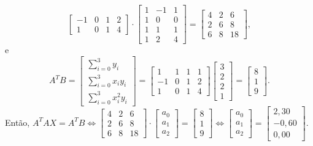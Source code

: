 \documentclass[12pt,a4paper]{article}
\begin{document}
\begin{ExerciseList}
\[\begin{bmatrix}
-1 & 0 & 1 & 2 \\
 1 & 0 & 1 & 4
\end{bmatrix}
\cdot
\begin{bmatrix}
  1 & -1 & 1\\
  1 & 0 & 0\\
  1 & 1 & 1\\
  1 & 2 & 4
\end{bmatrix}
=\begin{bmatrix}
4 & 2 & 6 \\
2 & 6 & 8 \\
6 & 8 & 18
\end{bmatrix},
\]
e
\[
A^T B
= \begin{bmatrix}
 \sum_{i=0}^3 y_i     \\
 \sum_{i=0}^3 x_i y_i \\
 \sum_{i=0}^3 x_i^2 y_i
\end{bmatrix}
= \begin{bmatrix}
 1 & 1 & 1 & 1 \\
-1 & 0 & 1 & 2 \\
 1 & 0 & 1 & 4
\end{bmatrix}
\begin{bmatrix}
3 \\ 2 \\ 2 \\ 1
\end{bmatrix}
= \begin{bmatrix}
8 \\ 1 \\ 9
\end{bmatrix}.
\]
Então,
$
A^T A X = A^T B
\Leftrightarrow
\begin{bmatrix}
4 & 2 & 6 \\
2 & 6 & 8 \\
6 & 8 & 18
\end{bmatrix}
\cdot
\begin{bmatrix}
a_0\\
a_1\\
a_2
\end{bmatrix}
=
\begin{bmatrix}
8 \\ 1 \\ 9
\end{bmatrix}
\Leftrightarrow
\begin{bmatrix}
a_0\\
a_1\\
a_2
\end{bmatrix}
=
\begin{bmatrix}
2,30\\
-0,60\\
0,00
\end{bmatrix}.
$


\end{ExerciseList}
\end{document}
